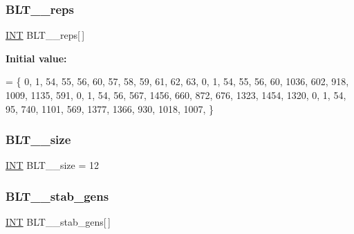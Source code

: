 \mbox{\label{data___b_l_t_8_c_aee4909033dcdbbe3937285e8a19c4103}} 
\subsubsection{\texorpdfstring{B\+L\+T\+\_\+\_\+reps}{BLT\_11\_reps}}
{\footnotesize\ttfamily \mbox{\hyperlink{galois_8h_a09fddde158a3a20bd2dcadb609de11dc}{I\+NT}} B\+L\+T\+\_\+\_\+reps\mbox{[}$\,$\mbox{]}}

{\bfseries Initial value\+:}
\begin{DoxyCode}
= \{
    0, 1, 54, 55, 56, 60, 57, 58, 59, 61, 62, 63, 
    0, 1, 54, 55, 56, 60, 1036, 602, 918, 1009, 1135, 591, 
    0, 1, 54, 56, 567, 1456, 660, 872, 676, 1323, 1454, 1320, 
    0, 1, 54, 95, 740, 1101, 569, 1377, 1366, 930, 1018, 1007, 
\}
\end{DoxyCode}
\mbox{\label{data___b_l_t_8_c_aefa7b368b32c3ed7eceef404ef01ce47}} 
\subsubsection{\texorpdfstring{B\+L\+T\+\_\+\_\+size}{BLT\_11\_size}}
{\footnotesize\ttfamily \mbox{\hyperlink{galois_8h_a09fddde158a3a20bd2dcadb609de11dc}{I\+NT}} B\+L\+T\+\_\+\_\+size = 12}

\mbox{\label{data___b_l_t_8_c_a5701e8453560051195b9e2993ef694c4}} 
\subsubsection{\texorpdfstring{B\+L\+T\+\_\+\_\+stab\+\_\+gens}{BLT\_11\_stab\_gens}}
{\footnotesize\ttfamily \mbox{\hyperlink{galois_8h_a09fddde158a3a20bd2dcadb609de11dc}{I\+NT}} B\+L\+T\+\_\+\_\+stab\+\_\+gens\mbox{[}$\,$\mbox{]}}

